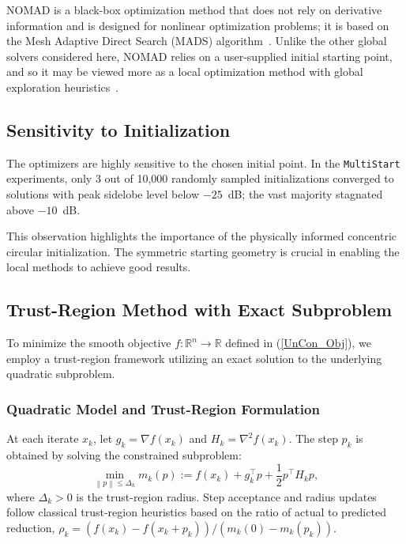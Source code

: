 \documentclass[11pt,letterpaper]{article}
\theoremstyle{definition}
\theoremstyle{plain}
\begin{document}
NOMAD is a black-box optimization method that does not rely on derivative information and is designed for nonlinear optimization problems; it is based on the Mesh Adaptive Direct Search (MADS) algorithm~\cite{G-2018-16}. Unlike the other global solvers considered here, NOMAD relies on a user-supplied initial starting point, and so it may be viewed more as a local optimization method with global exploration heuristics~\cite{AlAuGhKoLed2020}.



\subsection{Sensitivity to Initialization}

The optimizers are highly sensitive to the chosen initial point. In the \texttt{MultiStart} experiments, only 3 out of 10{,}000 randomly sampled initializations converged to solutions with peak sidelobe level below $-25$~dB; the vast majority stagnated above $-10$~dB.

This observation highlights the importance of the physically informed concentric circular initialization. The symmetric starting geometry is crucial in enabling the local methods to achieve good results.



\subsection{Trust-Region Method with Exact Subproblem}

To minimize the smooth objective $f:\mathbb{R}^n \to \mathbb{R}$ defined in (\ref{UnCon_Obj}), we employ a trust-region framework utilizing an exact solution to the underlying quadratic subproblem.

\subsubsection{Quadratic Model and Trust-Region Formulation}
At each iterate $x_k$, let $g_k = \nabla f(x_k)$ and $H_k = \nabla^2 f(x_k)$. The step $p_k$ is obtained by solving the constrained subproblem:
$$ \min_{\left\|p\right\| \le \Delta_k} m_k(p) := f(x_k) + g_k^\top p + \frac{1}{2} p^\top H_k p, $$
where $\Delta_k > 0$ is the trust-region radius. Step acceptance and radius updates follow classical trust-region heuristics based on the ratio of actual to predicted reduction, $\rho_k = (f(x_k) - f(x_k + p_k)) / (m_k(0) - m_k(p_k))$.
\end{document}
